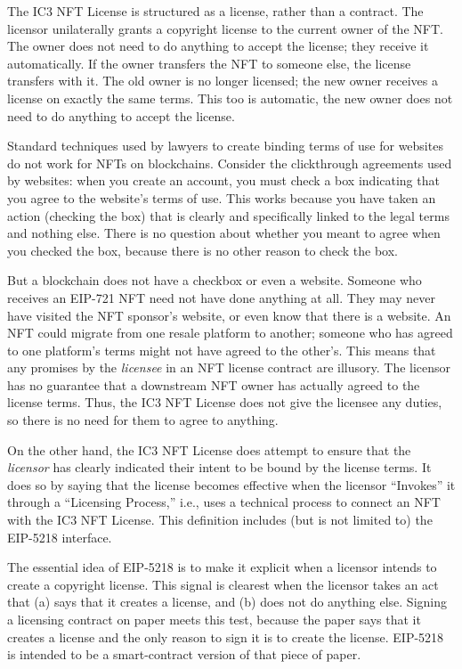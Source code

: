 \documentclass{article}
\newcommand{\eiplicense}{EIP-5218\xspace}
\newcommand{\iccclicense}{IC3 NFT License\xspace}
\begin{document}
The \iccclicense is structured as a license, rather than a contract. The licensor unilaterally grants a copyright license to the current owner of the NFT. The owner does not need to do anything to accept the license; they receive it automatically. If the owner transfers the NFT to someone else, the license transfers with it. The old owner is no longer licensed; the new owner receives a license on exactly the same terms. This too is automatic, the new owner does not need to do anything to accept the license.

Standard techniques used by lawyers to create binding terms of use for websites do not work for NFTs on blockchains. Consider the clickthrough agreements used by websites: when you create an account, you must check a box indicating that you agree to the website's terms of use. This works because you have taken an action (checking the box) that is clearly and specifically linked to the legal terms and nothing else. There is no question about whether you meant to agree when you checked the box, because there is no other reason to check the box. 

But a blockchain does not have a checkbox or even a website. Someone who receives an EIP-721 NFT need not have done anything at all. They may never have visited the NFT sponsor's website, or even know that there is a website. An NFT could migrate from one resale platform to another; someone who has agreed to one platform's terms might not have agreed to the other's. This means that any promises by the \emph{licensee} in an NFT license contract are illusory. The licensor has no guarantee that a downstream NFT owner has actually agreed to the license terms. Thus, the \iccclicense does not give the licensee any duties, so there is no need for them to agree to anything.

On the other hand, the \iccclicense does attempt to ensure that the \emph{licensor} has clearly indicated their intent to be bound by the license terms. It does so by saying that the license becomes effective when the licensor ``Invokes'' it through a ``Licensing Process,'' i.e., uses a technical process to connect an NFT with the \iccclicense. This definition includes (but is not limited to) the \eiplicense interface. 

The essential idea of \eiplicense  is to make it explicit when a licensor intends to create a copyright license. This signal is clearest when the licensor takes an act that (a) says that it creates a license, and (b) does not do anything else. Signing a licensing contract on paper meets this test, because the paper says that it creates a license and the only reason to sign it is to create the license. \eiplicense is intended to be a smart-contract version of that piece of paper. 
\end{document}
